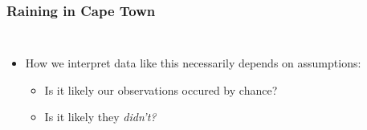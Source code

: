 \documentclass{beamer}
\begin{document}
\begin{frame}

\frametitle{Raining in Cape Town}

\begin{columns}[c]  \small

\begin{itemize}

	\item How we interpret data like this necessarily depends on assumptions:

	\begin{itemize}

		\item Is it likely our observations occured by chance?

		\item Is it likely they \emph{didn't?}

	\end{itemize}

\end{itemize}



\end{columns}
\end{frame}
\end{document}
